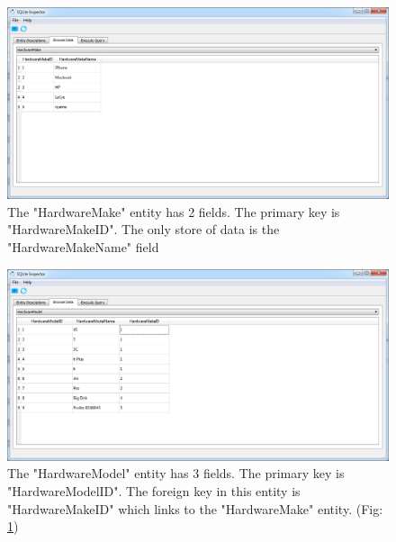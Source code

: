 \begin{figure}[H]
    \includegraphics[width=\textwidth]{./Maintenance/Images/HardwareMakeTable.png}
    \caption{The "HardwareMake" entity has 2 fields. The primary key is "HardwareMakeID". The only store of data is the "HardwareMakeName" field} \label{fig:HardwareMakeTable}
\end{figure}

\begin{figure}[H]
    \includegraphics[width=\textwidth]{./Maintenance/Images/HardwareModelTable.png}
    \caption{The "HardwareModel" entity has 3 fields. The primary key is "HardwareModelID". The foreign key in this entity is "HardwareMakeID" which links to the "HardwareMake" entity. (Fig: \ref{fig:HardwareMakeTable})} \label{fig:HardwareModelTable}
\end{figure}

